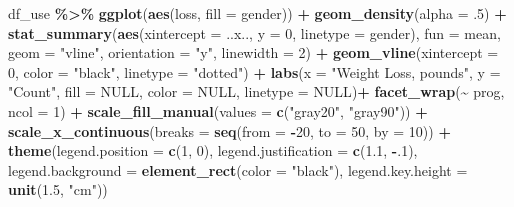 \documentclass[
]{article}
\newenvironment{Shaded}{\begin{snugshade}}{\end{snugshade}}
\newcommand{\AttributeTok}[1]{\textcolor[rgb]{0.13,0.29,0.53}{#1}}
\newcommand{\ConstantTok}[1]{\textcolor[rgb]{0.56,0.35,0.01}{#1}}
\newcommand{\DecValTok}[1]{\textcolor[rgb]{0.00,0.00,0.81}{#1}}
\newcommand{\FloatTok}[1]{\textcolor[rgb]{0.00,0.00,0.81}{#1}}
\newcommand{\FunctionTok}[1]{\textcolor[rgb]{0.13,0.29,0.53}{\textbf{#1}}}
\newcommand{\NormalTok}[1]{#1}
\newcommand{\SpecialCharTok}[1]{\textcolor[rgb]{0.81,0.36,0.00}{\textbf{#1}}}
\newcommand{\StringTok}[1]{\textcolor[rgb]{0.31,0.60,0.02}{#1}}
\begin{document}
\begin{Shaded}
\begin{Highlighting}[]
\NormalTok{df\_use }\SpecialCharTok{\%\textgreater{}\%} 
  \FunctionTok{ggplot}\NormalTok{(}\FunctionTok{aes}\NormalTok{(loss,}
             \AttributeTok{fill =}\NormalTok{ gender)) }\SpecialCharTok{+} 
  \FunctionTok{geom\_density}\NormalTok{(}\AttributeTok{alpha =}\NormalTok{ .}\DecValTok{5}\NormalTok{) }\SpecialCharTok{+}  
  \FunctionTok{stat\_summary}\NormalTok{(}\FunctionTok{aes}\NormalTok{(}\AttributeTok{xintercept =}\NormalTok{ ..x.., }
                   \AttributeTok{y =} \DecValTok{0}\NormalTok{,}
                   \AttributeTok{linetype =}\NormalTok{ gender), }
               \AttributeTok{fun =}\NormalTok{ mean, }
               \AttributeTok{geom =} \StringTok{"vline"}\NormalTok{, }
               \AttributeTok{orientation =} \StringTok{"y"}\NormalTok{,}
               \AttributeTok{linewidth =} \DecValTok{2}\NormalTok{) }\SpecialCharTok{+}
  \FunctionTok{geom\_vline}\NormalTok{(}\AttributeTok{xintercept =} \DecValTok{0}\NormalTok{, }
             \AttributeTok{color =} \StringTok{"black"}\NormalTok{, }
             \AttributeTok{linetype =} \StringTok{"dotted"}\NormalTok{) }\SpecialCharTok{+}
  \FunctionTok{labs}\NormalTok{(}\AttributeTok{x =} \StringTok{"Weight Loss, pounds"}\NormalTok{,}
       \AttributeTok{y =} \StringTok{"Count"}\NormalTok{,}
       \AttributeTok{fill =} \ConstantTok{NULL}\NormalTok{,}
       \AttributeTok{color =} \ConstantTok{NULL}\NormalTok{,}
       \AttributeTok{linetype =} \ConstantTok{NULL}\NormalTok{)}\SpecialCharTok{+}
  \FunctionTok{facet\_wrap}\NormalTok{(}\SpecialCharTok{\textasciitilde{}}\NormalTok{ prog, }\AttributeTok{ncol =} \DecValTok{1}\NormalTok{) }\SpecialCharTok{+}
  \FunctionTok{scale\_fill\_manual}\NormalTok{(}\AttributeTok{values =} \FunctionTok{c}\NormalTok{(}\StringTok{"gray20"}\NormalTok{, }\StringTok{"gray90"}\NormalTok{)) }\SpecialCharTok{+}
  \FunctionTok{scale\_x\_continuous}\NormalTok{(}\AttributeTok{breaks =} \FunctionTok{seq}\NormalTok{(}\AttributeTok{from =} \SpecialCharTok{{-}}\DecValTok{20}\NormalTok{, }\AttributeTok{to =} \DecValTok{50}\NormalTok{, }\AttributeTok{by =} \DecValTok{10}\NormalTok{)) }\SpecialCharTok{+}
  \FunctionTok{theme}\NormalTok{(}\AttributeTok{legend.position =} \FunctionTok{c}\NormalTok{(}\DecValTok{1}\NormalTok{, }\DecValTok{0}\NormalTok{),}
        \AttributeTok{legend.justification =} \FunctionTok{c}\NormalTok{(}\FloatTok{1.1}\NormalTok{, }\SpecialCharTok{{-}}\NormalTok{.}\DecValTok{1}\NormalTok{),}
        \AttributeTok{legend.background =} \FunctionTok{element\_rect}\NormalTok{(}\AttributeTok{color =} \StringTok{"black"}\NormalTok{),}
        \AttributeTok{legend.key.height =} \FunctionTok{unit}\NormalTok{(}\FloatTok{1.5}\NormalTok{, }\StringTok{"cm"}\NormalTok{))}
\end{Highlighting}
\end{Shaded}
\end{document}

